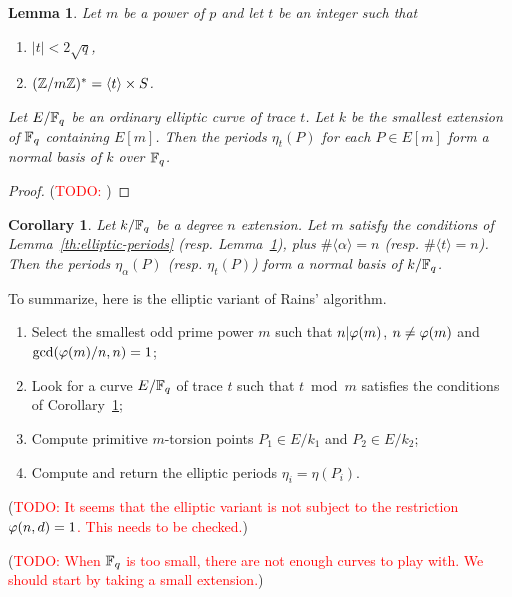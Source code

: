 \documentclass{article}
\newcommand{\todo}[1]{(\textcolor{red}{TODO: #1})}
\newtheorem{Lemma}{Lemma}
\newtheorem{Coro}{Corollary}
\begin{document}
\begin{Lemma}
  \label{th:elliptic-periods-p}
  Let $m$ be a power of $p$ and let $t$ be an integer such that
  \begin{enumerate}
  \item $|t|<2\sqrt{q}$,
  \item $(\mathbb{Z}/m\mathbb{Z})^\ast = \langle t\rangle \times S$.
  \end{enumerate}
  Let $E/\mathbb{F}_q$ be an ordinary elliptic curve of trace $t$. Let $k$ be
  the smallest extension of $\mathbb{F}_q$ containing $E[m]$. Then the periods
  $\eta_t(P)$ for each $P\in E[m]$ form a normal basis of $k$ over
  $\mathbb{F}_q$.
\end{Lemma}
\begin{proof}
  \todo{}
\end{proof}

\begin{Coro}
  \label{th:elliptic-rains}
  Let $k/\mathbb{F}_q$ be a degree $n$ extension. Let $m$ satisfy the
  conditions of Lemma~\ref{th:elliptic-periods}
  (resp. Lemma~\ref{th:elliptic-periods-p}), plus $\#\langle
  \alpha\rangle = n$ (resp. $\#\langle t\rangle=n$).  Then the periods
  $\eta_\alpha(P)$ (resp. $\eta_t(P)$) form a normal basis of
  $k/\mathbb{F}_q$.
\end{Coro}

To summarize, here is the elliptic variant of Rains' algorithm.

\begin{enumerate}
\item Select the smallest odd prime power $m$ such that $n|\varphi(m)$,
  $n\ne\varphi(m)$ and $\gcd(\varphi(m)/n,n)=1$;
\item Look for a curve $E/\mathbb{F}_q$ of trace $t$ such that $t\bmod m$
  satisfies the conditions of Corollary~\ref{th:elliptic-rains};
\item Compute primitive $m$-torsion points $P_1\in E/k_1$ and
  $P_2\in E/k_2$;
\item Compute and return the elliptic periods $\eta_i=\eta(P_i)$.
\end{enumerate}

\todo{It seems that the elliptic variant is not subject to the
  restriction $\varphi(n,d)=1$. This needs to be checked.}

\todo{When $\mathbb{F}_q$ is too small, there are not enough curves to play
  with. We should start by taking a small extension.}
\end{document}
